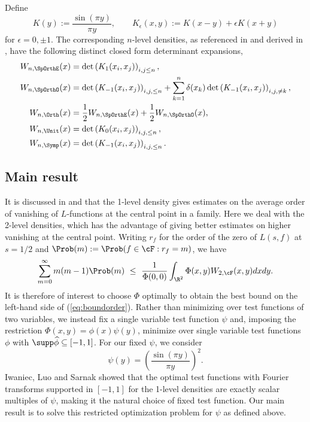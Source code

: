 Define
	\[ K(y) := \frac{\sin (\pi y)}{\pi y}, \qquad K_\epsilon (x, y) := K(x - y) + \epsilon K(x + y) \]
for $\epsilon = 0, \pm 1$. The corresponding $n$-level densities, as referenced in \cite{HughesMiller} and derived in \cite{KatzSarnak}, have the following distinct closed form determinant expansions, 
	\begin{align}
		W_{n, \SpOrthE} (x) 	
			&= \det \left( K_1 (x_i, x_j) \right)_{i, j \leq n}, \label{eq:nlevelSOeven} \\
		W_{n, \SpOrthO} (x)
			&= \det \left( K_{-1} (x_i, x_j) \right)_{i, j, \leq n} + \sum_{k = 1}^n \delta (x_k) \det \left( K_{-1} (x_i, x_j) \right)_{i, j, \neq k},  \\
		W_{n, \Orth} (x)
			&= \frac12 W_{n, \SpOrthE} (x) + \frac12 W_{n, \SpOrthO} (x), \\
		W_{n, \Unit} (x)
			&= \det \left( K_0 (x_i, x_j) \right)_{i, j, \leq n}, \\
		W_{n, \Symp} (x)			
			&=\det \left( K_{-1} (x_i, x_j) \right)_{i, j, \leq n} \label{eq:nlevelSymp}. 
	\end{align}

\subsection{Main result}

It is discussed in \cite{FreemanMiller} and \cite{ILS} that the 1-level density gives estimates on the average order of vanishing of $L$-functions at the central point in a family. Here we deal with the 2-level densities, which has the advantage of giving better estimates on higher vanishing at the central point. Writing $r_f$ for the order of the zero of $L(s, f)$ at $s = 1/2$ and $\Prob (m) := \Prob (f \in \cF : r_f = m)$, we have
\begin{align}
    \sum_{m = 0}^\infty m (m - 1) \Prob (m) \ \leq \ \frac{1}{\Phi(0,0)} \int_{\R^2} \Phi(x, y) W_{2, \cF} (x, y) dx dy. \label{eq:boundorder}
\end{align}
It is therefore of interest to choose $\Phi$ optimally to obtain the best bound on the left-hand side of (\ref{eq:boundorder}). Rather than minimizing over test functions of two variables, we instead fix a single variable test function $\psi$ and, imposing the restriction $\Phi(x, y) = \phi(x) \psi (y)$, minimize over single variable test functions $\phi$ with $\supp \widehat \phi \subseteq [-1, 1]$. For our fixed $\psi$, we consider
	\begin{equation}
		\psi(y) = \left( \frac{\sin (\pi y)}{\pi y} \right)^2.\label{eq:fixedtest}
	\end{equation}	
Iwaniec, Luo and Sarnak \cite{ILS} showed that the optimal test functions with Fourier transforms supported in $[-1, 1]$ for the 1-level densities are exactly scalar multiples of $\psi$, making it the natural choice of fixed test function. Our main result is to solve this restricted optimization problem for $\psi$ as defined above. 

